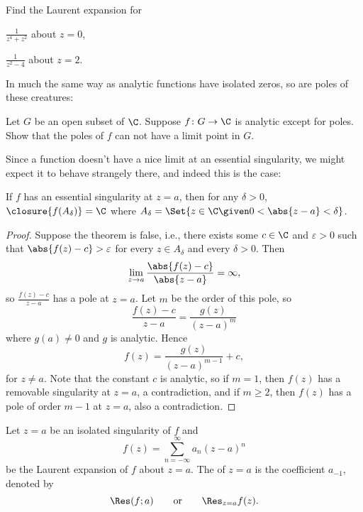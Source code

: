\begin{exercise}
	Find the Laurent expansion for
	\begin{parts}
		\item $\displaystyle \frac{1}{z^4 + z^2}$ about $z = 0$,
		\item $\displaystyle \frac{1}{z^2 - 4}$ about $z = 2$. \qedhere
	\end{parts}
\end{exercise}

In much the same way as analytic functions have isolated zeros, so are poles of these creatures:
\begin{exercise}
	Let $G$ be an open subset of $\C$.
	Suppose $f \colon G \to \C$ is analytic except for poles.
	Show that the poles of $f$ can not have a limit point in $G$.
\end{exercise}

Since a function doesn't have a nice limit at an essential singularity, we might expect it to behave strangely there, and indeed this is the case:

\begin{theorem}\label{thm5.4}
	If $f$ has an essential singularity at $z = a$, then for any $\delta > 0$, $\closure{f(A_\delta)} = \C$ where $A_\delta = \Set{z \in \C \given 0 < \abs{z - a} < \delta}$.
\end{theorem}

\begin{proof}
	Suppose the theorem is false, i.e., there exists some $c \in \C$ and $\varepsilon > 0$ such that $\abs{f(z) - c} > \varepsilon$ for every $z \in A_\delta$ and every $\delta > 0$.
	Then
	\[
		\lim_{z \to a} \frac{\abs{f(z) - c}}{\abs{z - a}} = \infty,
	\]
	so $\frac{f(z) - c}{z - a}$ has a pole at $z = a$.
	Let $m$ be the order of this pole, so
	\[
		\frac{f(z) - c}{z - a} = \frac{g(z)}{(z - a)^m}
	\]
	where $g(a) \neq 0$ and $g$ is analytic.
	Hence
	\[
		f(z) = \frac{g(z)}{(z - a)^{m - 1}} + c,
	\]
	for $z \neq a$.
	Note that the constant $c$ is analytic, so if $m = 1$, then $f(z)$ has a removable singularity at $z = a$, a contradiction, and if $m \geq 2$, then $f(z)$ has a pole of order $m - 1$ at $z = a$, also a contradiction.
\end{proof}


\begin{definition}[Residue]
	Let $z = a$ be an isolated singularity of $f$ and
	\[
		f(z) = \sum_{n = -\infty}^\infty a_n (z - a)^n
	\]
	be the Laurent expansion of $f$ about $z = a$.
	The  of $z = a$ is the coefficient $a_{-1}$, denoted by
	\[
		\Res(f; a) \qquad \text{or} \qquad \Res_{z = a} f(z).
	\]
\end{definition}

